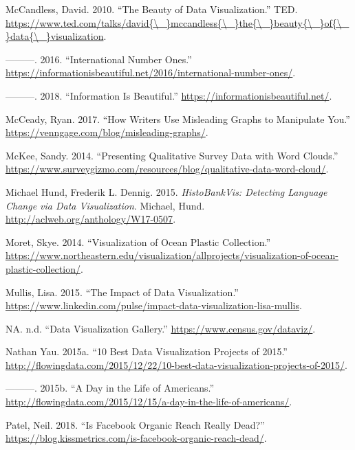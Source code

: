 \documentclass[]{book}
\begin{document}
\hypertarget{ref-viz_ted}{}
McCandless, David. 2010. ``The Beauty of Data Visualization.'' TED.
\href{https://www.ted.com/talks/david\%7B/_\%7Dmccandless\%7B/_\%7Dthe\%7B/_\%7Dbeauty\%7B/_\%7Dof\%7B/_\%7Ddata\%7B/_\%7Dvisualization}{https://www.ted.com/talks/david\{\textbackslash{}\_\}mccandless\{\textbackslash{}\_\}the\{\textbackslash{}\_\}beauty\{\textbackslash{}\_\}of\{\textbackslash{}\_\}data\{\textbackslash{}\_\}visualization}.

\hypertarget{ref-country_chart}{}
---------. 2016. ``International Number Ones.''
\url{https://informationisbeautiful.net/2016/international-number-ones/}.

\hypertarget{ref-info_beautiful}{}
---------. 2018. ``Information Is Beautiful.''
\url{https://informationisbeautiful.net/}.

\hypertarget{ref-writers_manipulate}{}
McCeady, Ryan. 2017. ``How Writers Use Misleading Graphs to Manipulate
You.'' \url{https://venngage.com/blog/misleading-graphs/}.

\hypertarget{ref-wordcloud}{}
McKee, Sandy. 2014. ``Presenting Qualitative Survey Data with Word
Clouds.''
\url{https://www.surveygizmo.com/resources/blog/qualitative-data-word-cloud/}.

\hypertarget{ref-lingui_data1}{}
Michael Hund, Frederik L. Dennig. 2015. \emph{HistoBankVis: Detecting
Language Change via Data Visualization}. Michael, Hund.
\url{http://aclweb.org/anthology/W17-0507}.

\hypertarget{ref-ocean_plastic_pollution}{}
Moret, Skye. 2014. ``Visualization of Ocean Plastic Collection.''
\url{https://www.northeastern.edu/visualization/allprojects/visualization-of-ocean-plastic-collection/}.

\hypertarget{ref-image_good}{}
Mullis, Lisa. 2015. ``The Impact of Data Visualization.''
\url{https://www.linkedin.com/pulse/impact-data-visualization-lisa-mullis}.

\hypertarget{ref-data_viz_gallery}{}
NA. n.d. ``Data Visualization Gallery.''
\url{https://www.census.gov/dataviz/}.

\hypertarget{ref-10_best}{}
Nathan Yau. 2015a. ``10 Best Data Visualization Projects of 2015.''
\url{http://flowingdata.com/2015/12/22/10-best-data-visualization-projects-of-2015/}.

\hypertarget{ref-American_life}{}
---------. 2015b. ``A Day in the Life of Americans.''
\url{http://flowingdata.com/2015/12/15/a-day-in-the-life-of-americans/}.

\hypertarget{ref-facebook_organic}{}
Patel, Neil. 2018. ``Is Facebook Organic Reach Really Dead?''
\url{https://blog.kissmetrics.com/is-facebook-organic-reach-dead/}.
\end{document}
